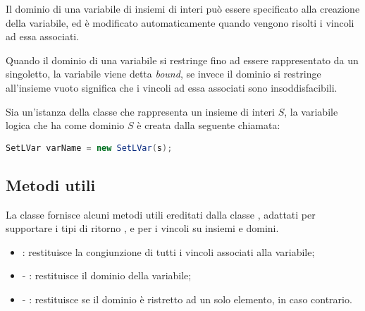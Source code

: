 Il dominio di una variabile di insiemi di interi può essere specificato alla
creazione della variabile, ed è modificato automaticamente quando vengono
risolti i vincoli ad essa associati.

Quando il dominio di una variabile si restringe fino ad essere rappresentato da
un singoletto, la variabile viene detta \emph{bound}, se
invece il dominio si restringe all'insieme vuoto significa che i vincoli ad
essa associati sono insoddisfacibili.

Sia  un'istanza della classe  che rappresenta un
insieme di interi $S$, la variabile logica che ha come dominio $S$ è creata 
dalla seguente chiamata:
\begin{center}
\lstinline[language = Java]!SetLVar varName = new SetLVar(s);!
\end{center}

\subsection{Metodi utili}
La classe  fornisce alcuni metodi utili ereditati dalla classe
, adattati per supportare i tipi di ritorno 
,  e per i vincoli su insiemi e domini.
\begin{itemize}
\item[-]: restituisce la congiunzione di
tutti i vincoli associati alla variabile;
\item[-]: restituisce il
dominio della variabile;
\item[-]: restituisce 
  se
il dominio è ristretto ad un solo elemento,   in caso contrario.
\end{itemize}

